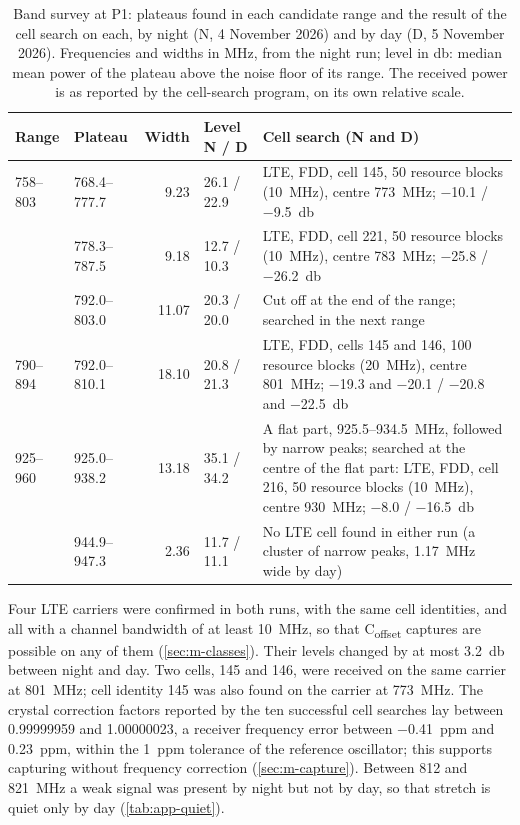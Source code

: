 \begin{table}[tbp]
  \centering
  \small
  \caption[Band survey: plateaus and cell searches]{Band survey at P1: plateaus found in each candidate range and the result of the cell search on each, by night (N, 4 November 2026) and by day (D, 5 November 2026). Frequencies and widths in \unit{\mega\hertz}, from the night run; level in \unit{\decibel}: median mean power of the plateau above the noise floor of its range. The received power is as reported by the cell-search program, on its own relative scale.}
  \label{tab:app-survey}
  \begin{tabularx}{\textwidth}{@{} l l r l >{\raggedright\arraybackslash}X @{}}
    \toprule
    Range & Plateau & Width & Level N / D & Cell search (N and D) \\
    \midrule
    758--803 & 768.4--777.7 & 9.23 & 26.1 / 22.9 & LTE, FDD, cell 145, 50 resource blocks (\qty{10}{\mega\hertz}), centre \qty{773}{\mega\hertz}; \qty{-10.1}{} / \qty{-9.5}{\decibel} \\
     & 778.3--787.5 & 9.18 & 12.7 / 10.3 & LTE, FDD, cell 221, 50 resource blocks (\qty{10}{\mega\hertz}), centre \qty{783}{\mega\hertz}; \qty{-25.8}{} / \qty{-26.2}{\decibel} \\
     & 792.0--803.0 & 11.07 & 20.3 / 20.0 & Cut off at the end of the range; searched in the next range \\
    790--894 & 792.0--810.1 & 18.10 & 20.8 / 21.3 & LTE, FDD, cells 145 and 146, 100 resource blocks (\qty{20}{\mega\hertz}), centre \qty{801}{\mega\hertz}; \qty{-19.3}{} and \qty{-20.1}{} / \qty{-20.8}{} and \qty{-22.5}{\decibel} \\
    925--960 & 925.0--938.2 & 13.18 & 35.1 / 34.2 & A flat part, 925.5--934.5~MHz, followed by narrow peaks; searched at the centre of the flat part: LTE, FDD, cell 216, 50 resource blocks (\qty{10}{\mega\hertz}), centre \qty{930}{\mega\hertz}; \qty{-8.0}{} / \qty{-16.5}{\decibel} \\
     & 944.9--947.3 & 2.36 & 11.7 / 11.1 & No LTE cell found in either run (a cluster of narrow peaks, \qty{1.17}{\mega\hertz} wide by day) \\
    \bottomrule
  \end{tabularx}
\end{table}

Four LTE carriers were confirmed in both runs, with the same cell identities, and all with a channel bandwidth of at least \qty{10}{\mega\hertz}, so that C\textsubscript{offset} captures are possible on any of them (\cref{sec:m-classes}). Their levels changed by at most \qty{3.2}{\decibel} between night and day. Two cells, 145 and 146, were received on the same carrier at \qty{801}{\mega\hertz}; cell identity 145 was also found on the carrier at \qty{773}{\mega\hertz}. The crystal correction factors reported by the ten successful cell searches lay between 0.99999959 and 1.00000023, a receiver frequency error between \qty{-0.41}{ppm} and \qty{+0.23}{ppm}, within the \qty{1}{ppm} tolerance of the reference oscillator; this supports capturing without frequency correction (\cref{sec:m-capture}). Between 812 and \qty{821}{\mega\hertz} a weak signal was present by night but not by day, so that stretch is quiet only by day (\cref{tab:app-quiet}).

